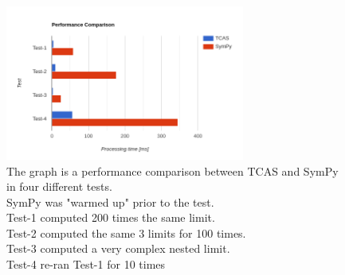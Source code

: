 \documentclass{article}
\theoremstyle{plain}
\theoremstyle{definition}
\begin{document}
    \begin{figure}
		\centering
		\includegraphics[width=0.7\textwidth]{img/performance_graph.PNG}
		\caption{The graph is a performance comparison between TCAS and SymPy in four different tests.\\SymPy was "warmed up" prior to the test.\\Test-1 computed 200 times the same limit.\\Test-2 computed the same 3 limits for 100 times.\\Test-3 computed a very complex nested limit.\\Test-4 re-ran Test-1 for 10 times} \label{fig:performance_graph}  
	\end{figure}

	
	
\end{document}
